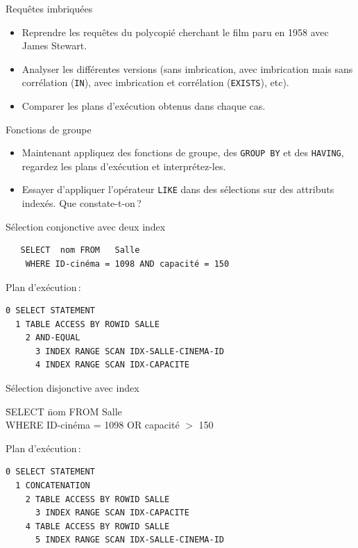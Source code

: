 \begin{frame}{Requêtes imbriquées}{

\begin{itemize}
  \item Reprendre les requêtes du polycopié
cherchant le film paru en 1958 avec James Stewart.

 \item Analyser les différentes versions 
(sans imbrication, avec
imbrication mais sans corrélation (\texttt{IN}),
avec imbrication et corrélation (\texttt{EXISTS}), 
etc). 

 \item Comparer les plans d'exécution obtenus
dans chaque cas.
\end{itemize}

}\end{frame}
\begin{frame}{Fonctions de groupe}{

\begin{itemize}
  \item  Maintenant appliquez des fonctions de groupe,
des \texttt{GROUP BY} et des \texttt{HAVING},
regardez les plans d'exécution et interprétez-les.

 \item Essayer d'appliquer l'opérateur \texttt{LIKE}
dans des sélections sur des attributs indexés.
Que constate-t-on\,? 
\end{itemize}

}\end{frame}



\begin{frame}{Sélection conjonctive avec deux index}{


\begin{verbatim}
   SELECT  nom FROM   Salle 
    WHERE ID-cinéma = 1098 AND capacité = 150
\end{verbatim}
Plan d'exécution\,:
\begin{verbatim}
0 SELECT STATEMENT
  1 TABLE ACCESS BY ROWID SALLE
    2 AND-EQUAL
      3 INDEX RANGE SCAN IDX-SALLE-CINEMA-ID
      4 INDEX RANGE SCAN IDX-CAPACITE
\end{verbatim}
}\end{frame}

\begin{frame}{Sélection disjonctive avec index}{


\begin{tabbing}
   \=  SELECT \= nom FROM   Salle \\
   \>  WHERE  \>  ID-cinéma = 1098 OR capacité $>$ 150
\end{tabbing}
Plan d'exécution\,:
\begin{verbatim}
0 SELECT STATEMENT
  1 CONCATENATION
    2 TABLE ACCESS BY ROWID SALLE
      3 INDEX RANGE SCAN IDX-CAPACITE
    4 TABLE ACCESS BY ROWID SALLE
      5 INDEX RANGE SCAN IDX-SALLE-CINEMA-ID
\end{verbatim}
}\end{frame}

